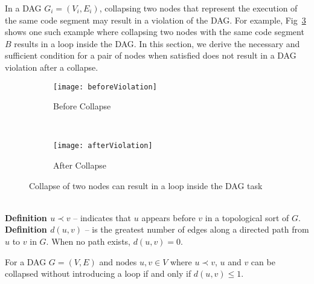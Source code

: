 In a DAG ${G_i = (V_i, E_i)}$, collapsing two nodes that represent the
execution of the same code segment may result in a violation of the
DAG. For example, Fig~\ref{fig:dag-violation} shows one such example
where collapsing two nodes with the same code segment $B$ results in a
loop inside the DAG. In this section, we derive the necessary and
sufficient condition for a pair of nodes when satisfied does not
result in a DAG violation after a collapse.


\begin{figure}
  \centering
  \begin{subfigure}[b]{0.48\textwidth}{
      \texttt{[image: beforeViolation]}
      \caption{Before Collapse}
      \label{fig:beforeViolation}
    }
  \end{subfigure}~
  \begin{subfigure}[b]{0.33\textwidth}{
      \texttt{[image: afterViolation]}
      \caption{After Collapse}
      \label{fig:afterViolation}
    }
  \end{subfigure}
  \caption{Collapse of two nodes can result in a loop inside the DAG task}
  \label{fig:dag-violation}
\end{figure}

 \\
\textbf{Definition ${u \prec v}$} -- indicates that ${u}$ appears
before ${v}$ in a topological sort of ${G}$. \\
\textbf{Definition ${d(u, v)}$} -- is the greatest number of edges
along a directed path from ${u}$ to ${v}$ in ${G}$. When no path
exists, ${d(u,v) = 0}$.

\begin{theorem}
  For a DAG ${G = (V, E)}$ and nodes ${u, v \in V}$ where ${u \prec
    v}$, ${u}$ and ${v}$ can be collapsed without introducing a loop
  if and  only if ${d(u, v) \le 1}$.
\end{theorem}


